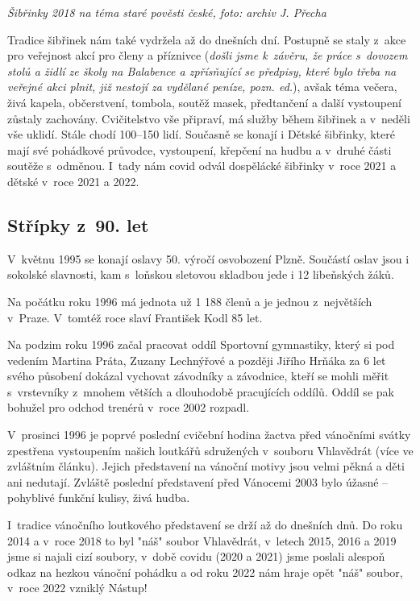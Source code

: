 \documentclass[a5paper, 12pt, twoside]{article}
\begin{document}

\textit{Šibřinky 2018 na téma staré pověsti české, foto: archiv J. Přecha}

Tradice šibřinek nám také vydržela až do dnešních dní. Postupně se staly
z~akce pro veřejnost akcí pro členy a příznivce (\textit{došli jsme
k~závěru, že práce s~dovozem stolů a židlí ze školy na Balabence a
zpřísňující se předpisy, které bylo třeba na veřejné akci plnit, již
nestojí za vydělané peníze, pozn. ed.}), avšak téma večera, živá kapela,
občerstvení, tombola, soutěž masek, předtančení a další vystoupení
zůstaly zachovány. Cvičitelstvo vše připraví, má služby během šibřinek a
v~neděli vše uklidí. Stále chodí 100--150 lidí. Současně se konají i
Dětské šibřinky, které mají své pohádkové průvodce, vystoupení, křepčení
na hudbu a v~druhé části soutěže s~odměnou. I~tady nám covid odvál
dospělácké šibřinky v~roce 2021 a dětské v~roce 2021 a 2022.

\subsection{Střípky z~90. let}

V~květnu 1995 se konají oslavy 50. výročí osvobození Plzně. Součástí
oslav jsou i sokolské slavnosti, kam s~loňskou sletovou skladbou jede i
12 libeňských žáků.

Na počátku roku 1996 má jednota už 1 188 členů a je jednou z~největších
v~Praze. V~tomtéž roce slaví František Kodl 85 let.

Na podzim roku 1996 začal pracovat oddíl Sportovní gymnastiky, který si
pod vedením Martina Práta, Zuzany Lechnýřové a později Jiřího Hrňáka za
6 let svého působení dokázal vychovat závodníky a závodnice, kteří se
mohli měřit s~vrstevníky z~mnohem větších a dlouhodobě pracujících
oddílů. Oddíl se pak bohužel pro odchod trenérů v~roce 2002 rozpadl.

V~prosinci 1996 je poprvé poslední cvičební hodina žactva před vánočními
svátky zpestřena vystoupením našich loutkářů sdružených v~souboru
Vhlavědrát (více ve zvláštním článku). Jejich představení na vánoční
motivy jsou velmi pěkná a děti ani nedutají. Zvláště poslední
představení před Vánocemi 2003 bylo úžasné -- pohyblivé funkční kulisy,
živá hudba.

I~tradice vánočního loutkového představení se drží až do dnešních dnů.
Do roku 2014 a v~roce 2018 to byl "náš" soubor Vhlavědrát, v~letech
2015, 2016 a 2019 jsme si najali cizí soubory, v~době covidu (2020 a
2021) jsme poslali alespoň odkaz na hezkou vánoční pohádku a od roku
2022 nám hraje opět "náš" soubor, v~roce 2022 vzniklý Nástup!
\end{document}
